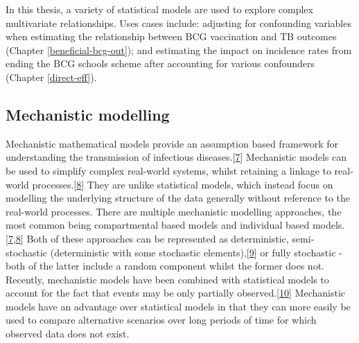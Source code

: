 \documentclass[11pt,twoside]{bristolthesis}
\begin{document}
  In this thesis, a variety of statistical models are used to explore complex multivariate relationships. Uses cases include: adjusting for confounding variables when estimating the relationship between BCG vaccination and TB outcomes (Chapter \ref{beneficial-bcg-out}); and estimating the impact on incidence rates from ending the BCG schools scheme after accounting for various confounders (Chapter \ref{direct-eff}).
  
  \hypertarget{mechanistic-modelling}{%
  \subsection{Mechanistic modelling}\label{mechanistic-modelling}}
  
  Mechanistic mathematical models provide an assumption based framework for understanding the transmission of infectious diseases.{[}\protect\hyperlink{ref-Anderson1991}{7}{]} Mechanistic models can be used to simplify complex real-world systems, whilst retaining a linkage to real-world processes.{[}\protect\hyperlink{ref-Keeling2007}{8}{]} They are unlike statistical models, which instead focus on modelling the underlying structure of the data generally without reference to the real-world processes. There are multiple mechanistic modelling approaches, the most common being compartmental based models and individual based models.{[}\protect\hyperlink{ref-Anderson1991}{7},\protect\hyperlink{ref-Keeling2007}{8}{]} Both of these approaches can be represented as deterministic, semi-stochastic (deterministic with some stochastic elements),{[}\protect\hyperlink{ref-Funk2016a}{9}{]} or fully stochastic - both of the latter include a random component whilst the former does not. Recently, mechanistic models have been combined with statistical models to account for the fact that events may be only partially observed.{[}\protect\hyperlink{ref-King2016}{10}{]} Mechanistic models have an advantage over statistical models in that they can more easily be used to compare alternative scenarios over long periods of time for which observed data does not exist.
  
\end{document}
